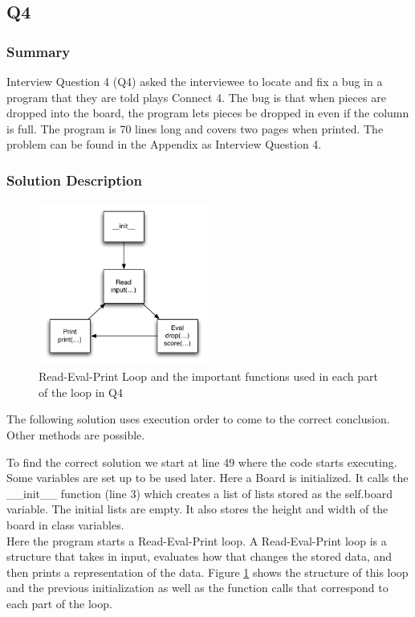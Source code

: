 \subsection{Q4}
\subsubsection{Summary}
Interview Question 4 (Q4) asked the interviewee to locate and fix a bug in a program that they are told plays Connect 4.
The bug is that when pieces are dropped into the board, the program lets pieces be dropped in even if the column is full.
The program is 70 lines long and covers two pages when printed.
The problem can be found in the Appendix as Interview Question 4.

\subsubsection{Solution Description}
\begin{figure}[t]
\centering
\includegraphics[width=0.5\textwidth]{Q4diagram.pdf}
\caption{Read-Eval-Print Loop and the important functions used in each part of the loop in Q4}
\label{fig-q2}
\end{figure}

The following solution uses execution order to come to the correct conclusion. Other methods are possible. 

To find the correct solution we start at line 49 where the code starts executing.
Some variables are set up to be used later. 
Here a Board is initialized.
It calls the \_\_init\_\_ function (line 3) which creates a list of lists stored as the self.board variable.
The initial lists are empty.
It also stores the height and width of the board in class variables. \\

Here the program starts a Read-Eval-Print loop. A Read-Eval-Print loop is a structure that takes in input, evaluates how that changes the stored data, and then prints a representation of the data. Figure \ref{fig-q2} shows the structure of this loop and the previous initialization as well as the function calls that correspond to each part of the loop.\\

